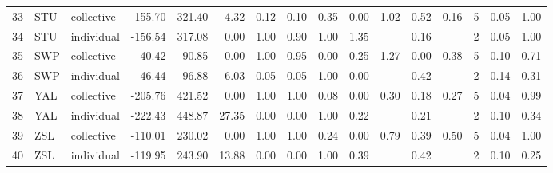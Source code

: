 {\begin{tabular}{rllrrrrrrrrrrrrr}
  33 & STU & collective & -155.70 & 321.40 & 4.32 & 0.12 & 0.10 & 0.35 & 0.00 & 1.02 & 0.52 & 0.16 &   5 & 0.05 & 1.00 \\ 
  34 & STU & individual & -156.54 & 317.08 & 0.00 & 1.00 & 0.90 & 1.00 & 1.35 &  & 0.16 &  &   2 & 0.05 & 1.00 \\ 
  35 & SWP & collective & -40.42 & 90.85 & 0.00 & 1.00 & 0.95 & 0.00 & 0.25 & 1.27 & 0.00 & 0.38 &   5 & 0.10 & 0.71 \\ 
  36 & SWP & individual & -46.44 & 96.88 & 6.03 & 0.05 & 0.05 & 1.00 & 0.00 &  & 0.42 &  &   2 & 0.14 & 0.31 \\ 
  37 & YAL & collective & -205.76 & 421.52 & 0.00 & 1.00 & 1.00 & 0.08 & 0.00 & 0.30 & 0.18 & 0.27 &   5 & 0.04 & 0.99 \\ 
  38 & YAL & individual & -222.43 & 448.87 & 27.35 & 0.00 & 0.00 & 1.00 & 0.22 &  & 0.21 &  &   2 & 0.10 & 0.34 \\ 
  39 & ZSL & collective & -110.01 & 230.02 & 0.00 & 1.00 & 1.00 & 0.24 & 0.00 & 0.79 & 0.39 & 0.50 &   5 & 0.04 & 1.00 \\ 
  40 & ZSL & individual & -119.95 & 243.90 & 13.88 & 0.00 & 0.00 & 1.00 & 0.39 &  & 0.42 &  &   2 & 0.10 & 0.25 \\ 
   \hline
\end{tabular}
}
